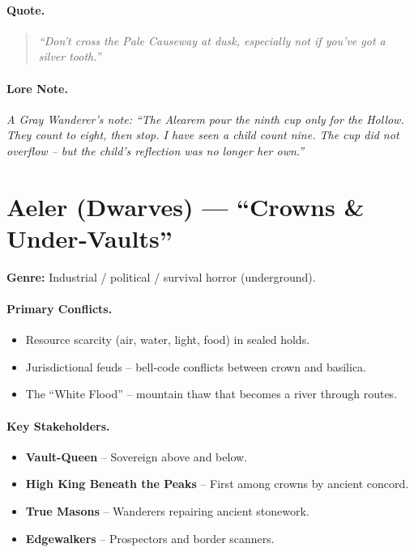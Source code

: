 \paragraph{Quote.}
\begin{quote}
\emph{“Don't cross the Pale Causeway at dusk, especially not if you've got a silver tooth.”}
\end{quote}

\paragraph{Lore Note.}
\emph{A Gray Wanderer’s note: “The Alearem pour the ninth cup only for the Hollow. They count to eight, then stop. I have seen a child count nine. The cup did not overflow – but the child’s reflection was no longer her own.”}

\section{Aeler (Dwarves) — “Crowns \& Under‑Vaults”}
\textbf{Genre:} Industrial / political / survival horror (underground).

\paragraph{Primary Conflicts.}
\begin{itemize}
  \item Resource scarcity (air, water, light, food) in sealed holds.
  \item Jurisdictional feuds – bell‑code conflicts between crown and basilica.
  \item The “White Flood” – mountain thaw that becomes a river through routes.
\end{itemize}

\paragraph{Key Stakeholders.}
\begin{itemize}
  \item \textbf{Vault-Queen} – Sovereign above and below.
  \item \textbf{High King Beneath the Peaks} – First among crowns by ancient concord.
  \item \textbf{True Masons} – Wanderers repairing ancient stonework.
  \item \textbf{Edgewalkers} – Prospectors and border scanners.
\end{itemize}

